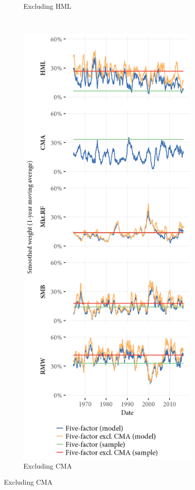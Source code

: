 \begin{figure}[htbp]
\begin{subfigure}{0.45\textwidth}
    \caption{Excluding HML}
  \end{subfigure}
  ~
  \begin{subfigure}{0.45\textwidth}
    \includegraphics[width=\textwidth]{graphics/Weights_5F_EXCL_CMA_5F.png}
    \caption{Excluding CMA}
  \end{subfigure}  
\end{figure}

